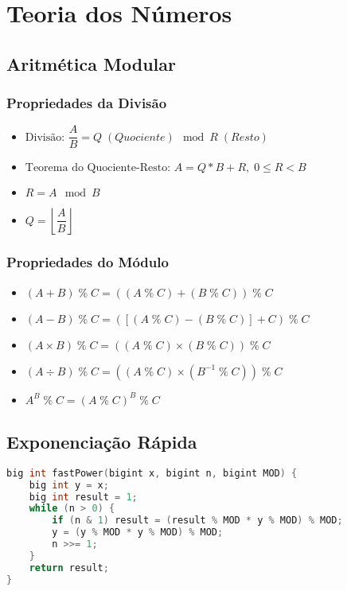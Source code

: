 \section{Teoria dos Números}
\subsection{Aritmética Modular}
\subsubsection*{Propriedades da Divisão}
\begin{itemize}
	\item $\text{Divisão: }\dfrac{A}{B}=Q\;(Quociente) \mod R\;(Resto)$
	\item $\text{Teorema do Quociente-Resto: }A=Q*B+R,\;0\leq R<B$
	\item $R=A\mod B$
	\item $Q=\left\lfloor\dfrac{A}{B}\right\rfloor$
\end{itemize}

\newpage

\subsubsection*{Propriedades do Módulo}
\begin{itemize}
	\item $\left(A + B\right) \;\%\; C = 
	      \left(\left(A \;\%\; C\right) + 
	      \left(B \;\%\; C\right)\right) \;\%\; C$
	\item $\left(A - B\right) \;\%\; C = 
	      \left(\left[\left(A \;\%\; C\right) -
	      \left(B \;\%\; C\right)\right] + C\right) \;\%\; C$
	\item $\left(A \times B\right) \;\%\; C = 
	      \left(\left(A \;\%\; C\right) \times
	      \left(B \;\%\; C\right)\right) \;\%\; C$
	\item $\left(A \div B\right) \;\%\; C = 
	      \left(\left(A \;\%\; C\right) \times
	      \left(B^{-1} \;\%\; C\right)\right) \;\%\; C$
	\item $A^{B} \;\%\; C = \left(A \;\%\; C\right)^{B} \;\%\; C$
\end{itemize}

\subsection{Exponenciação Rápida}
\begin{lstlisting}[language=C++]
big int fastPower(bigint x, bigint n, bigint MOD) {
    big int y = x;
    big int result = 1;
    while (n > 0) {
        if (n & 1) result = (result % MOD * y % MOD) % MOD;
        y = (y % MOD * y % MOD) % MOD;
        n >>= 1;
    }
    return result;
}
\end{lstlisting}

